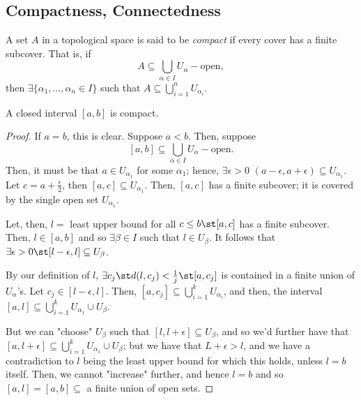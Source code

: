 \subsection{Compactness, Connectedness}

\begin{definition}[Compact]
        A set $A$ in a topological space is said to be \emph{compact} if every cover has a finite subcover. That is, if \[
        A \subseteq \bigcup_{\alpha \in I} U_\alpha-\text{open},    
        \]
        then $\exists \{\alpha_1, \dots, \alpha_n \in I\}$ such that $A \subseteq \bigcup_{i=1}^n U_{\alpha_i}$.
\end{definition}

\begin{proposition}\label{prop:closedcompact}
    A closed interval $[a, b]$ is compact.
\end{proposition}

\begin{proof}
    If $a = b$, this is clear. Suppose $a < b$. Then, suppose \[
    [a, b] \subseteq \bigcup_{\alpha \in I} U_\alpha-\text{open}.    
    \]
    Then, it must be that $a \in U_{\alpha_1}$ for some $\alpha_1$; hence, $\exists \epsilon > 0$ $(a - \epsilon, a + \epsilon) \subseteq U_{\alpha_1}$. Let $c = a + \frac{\epsilon}{2}$, then $[a, c] \subseteq U_{\alpha_1}$. Then, $[a,c]$ has a finite subcover; it is covered by the single open set $U_{\alpha_1}$.

    Let, then, $l = $ least upper bound for all $c\leq b \st [a, c]$ has a finite subcover. Then, $l \in [a,b]$ and so $\exists \beta \in I$ such that $l \in U_\beta$. It follows that $\exists \epsilon > 0 \st [l - \epsilon, l] \subseteq U_\beta$. 

    By our definition of $l$, $\exists c_j \st d(l, c_j) < \frac{1}{j} \st [a, c_j]$ is contained in a finite union of $U_\alpha$'s. Let $c_j \in [l-\epsilon, l]$. Then, $[a, c_j] \subseteq \bigcup_{i=1}^{k} U_{\alpha_i}$, and then, the interval $[a, l] \subseteq \bigcup_{i=1}^{k}U_{\alpha_1} \cup U_{\beta}$. 
    
    But we can "choose" $U_\beta$ such that $[l, l + \epsilon] \subseteq U_\beta$, and so we'd further have that $[a, l + \epsilon] \subseteq \bigcup_{i=1}^{k}U_{\alpha_1} \cup U_{\beta}$; but we have that $L + \epsilon > l$, and we have a contradiction to $l$ being the least upper bound for which this holds, unless $l = b$ itself. Then, we cannot "increase" further, and hence $l = b$ and so $[a, l] = [a, b] \subseteq$ a finite union of open sets.
\end{proof}

